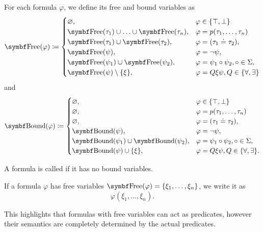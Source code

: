 \begin{definition}
  For each formula \( \varphi \), we define its free and bound variables as
  \begin{align*}
    \Bold{Free}(\varphi) \coloneqq \begin{cases}
      \varnothing,                                             &\varphi \in \{ \top, \bot \} \\
      \Bold{Free}(\tau_1) \cup \ldots \cup \Bold{Free}(\tau_n), &\varphi = p(\tau_1, \ldots, \tau_n) \\
      \Bold{Free}(\tau_1) \cup \Bold{Free}(\tau_2),             &\varphi = (\tau_1 \doteq \tau_2), \\
      \Bold{Free}(\psi),                                        &\varphi = \neg \psi, \\
      \Bold{Free}(\psi_1) \cup \Bold{Free}(\psi_2),             &\varphi = \psi_1 \circ \psi_2, \circ \in \Sigma, \\
      \Bold{Free}(\psi) \setminus \{ \xi \},                    &\varphi = Q \xi \psi, Q \in \{ \forall, \exists \}
    \end{cases}
  \end{align*}
  and
  \begin{align*}
    \Cat{Bound}(\varphi) \coloneqq \begin{cases}
      \varnothing,                                             &\varphi \in \{ \top, \bot \} \\
      \varnothing,                                             &\varphi = p(\tau_1, \ldots, \tau_n) \\
      \varnothing,                                             &\varphi = (\tau_1 \doteq \tau_2), \\
      \Cat{Bound}(\psi),                                       &\varphi = \neg \psi, \\
      \Cat{Bound}(\psi_1) \cup \Bold{Bound}(\psi_2),           &\varphi = \psi_1 \circ \psi_2, \circ \in \Sigma, \\
      \Cat{Bound}(\psi) \cup \{ \xi \},                        &\varphi = Q \xi \psi, Q \in \{ \forall, \exists \}.
    \end{cases}
  \end{align*}

  A formula is called  if it has no bound variables.

  If a formula \( \varphi \) has free variables \( \Bold{Free}(\varphi) = \{ \xi_1, \ldots, \xi_n \} \), we write it as
  \begin{equation*}
    \varphi(\xi_1, \ldots, \xi_n).
  \end{equation*}

  This highlights that formulas with free variables can act as predicates, however their semantics are completely determined by the actual predicates.
\end{definition}

